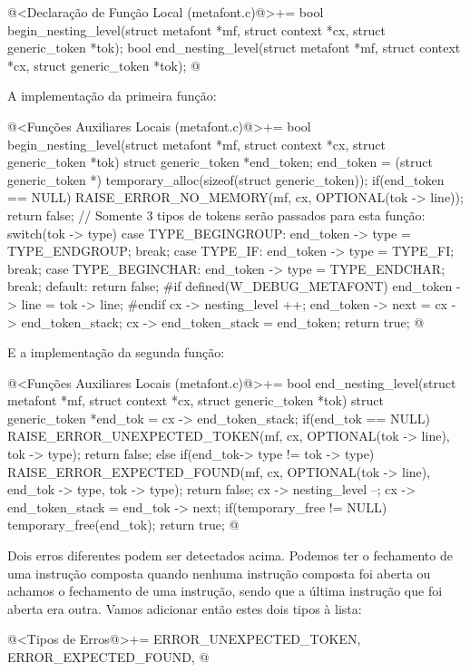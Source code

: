 \iniciocodigo
@<Declaração de Função Local (metafont.c)@>+=
bool begin_nesting_level(struct metafont *mf, struct context *cx,
                         struct generic_token *tok);
bool end_nesting_level(struct metafont *mf, struct context *cx,
                       struct generic_token *tok);
@
\fimcodigo

A implementação da primeira função:

\iniciocodigo
@<Funções Auxiliares Locais (metafont.c)@>+=
bool begin_nesting_level(struct metafont *mf, struct context *cx,
                         struct generic_token *tok){
  struct generic_token *end_token;
  end_token = (struct generic_token *)
                    temporary_alloc(sizeof(struct generic_token));
  if(end_token == NULL){
    RAISE_ERROR_NO_MEMORY(mf, cx, OPTIONAL(tok -> line));
    return false;
  }
  // Somente 3 tipos de tokens serão passados para esta função:
  switch(tok -> type){
  case TYPE_BEGINGROUP:
    end_token -> type = TYPE_ENDGROUP;
    break;
  case TYPE_IF:
    end_token -> type = TYPE_FI;
    break;
  case TYPE_BEGINCHAR:
    end_token -> type = TYPE_ENDCHAR;
    break;
  default:
    return false;
  }
#if defined(W_DEBUG_METAFONT)
  end_token -> line = tok -> line;
#endif
  cx -> nesting_level ++;
  end_token -> next = cx -> end_token_stack;
  cx -> end_token_stack = end_token;
  return true;
}
@
\fimcodigo

E a implementação da segunda função:

\iniciocodigo
@<Funções Auxiliares Locais (metafont.c)@>+=
bool end_nesting_level(struct metafont *mf, struct context *cx,
                       struct generic_token *tok){
  struct generic_token *end_tok = cx -> end_token_stack;
  if(end_tok == NULL){
    RAISE_ERROR_UNEXPECTED_TOKEN(mf, cx, OPTIONAL(tok -> line), tok -> type);
    return false;
  }
  else if(end_tok-> type != tok -> type){
    RAISE_ERROR_EXPECTED_FOUND(mf, cx, OPTIONAL(tok -> line),
                               end_tok -> type, tok -> type);
    return false;
  }
  cx -> nesting_level --;
  cx -> end_token_stack = end_tok -> next;
  if(temporary_free != NULL)
    temporary_free(end_tok);
  return true;
}
@
\fimcodigo

Dois erros diferentes podem ser detectados acima. Podemos ter o
fechamento de uma instrução composta quando nenhuma instrução composta
foi aberta ou achamos o fechamento de uma instrução, sendo que a
última instrução que foi aberta era outra. Vamos adicionar então estes
dois tipos à lista:

\iniciocodigo
@<Tipos de Erros@>+=
ERROR_UNEXPECTED_TOKEN, ERROR_EXPECTED_FOUND,
@
\fimcodigo

